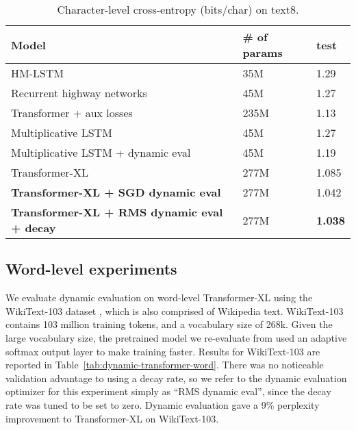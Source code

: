 \documentclass{article} \usepackage{iclr2018_conference,times}
\begin{document}
\begin{table*}[tb]
\begin{center}
\begin{adjustbox}{width=1\textwidth}
\begin{tabular}{l  l  l  } \toprule
Model & \# of params & test \\
\midrule
HM-LSTM \citep{chung2017} & 35M & 1.29 \\
Recurrent highway networks \citep{zilly2017} & 45M & 1.27   \\
Transformer + aux losses \citep{al2018} & 235M & 1.13 \\
Multiplicative LSTM \citep{krause2016} & 45M & 1.27  \\
Multiplicative LSTM + dynamic eval \citep{krause2018} & 45M & 1.19 \\
\midrule
Transformer-XL \citep{dai2019} & 277M  & 1.085 \\
\textbf{Transformer-XL + SGD dynamic eval} &  277M  & 1.042  \\
\textbf{Transformer-XL + RMS dynamic eval + decay} & 277M  & \textbf{1.038}   \\
\bottomrule
\end{tabular}
\end{adjustbox}
\end{center}
\caption{Character-level cross-entropy (bits/char) on text8.}
\label{tab:dynamic-transformer-text8}
\end{table*}

\subsection{Word-level experiments}

We evaluate dynamic evaluation on word-level Transformer-XL using the WikiText-103 dataset \citep{Merity2016}, which is also comprised of Wikipedia text. WikiText-103 contains 103 million training tokens, and a vocabulary size of 268k. Given the large vocabulary size, the pretrained model we re-evaluate from \citet{dai2019} used an adaptive softmax output layer \citep{grave2017a} to make training faster. Results for WikiText-103 are reported in Table~\ref{tab:dynamic-transformer-word}. There was no noticeable validation advantage to using a decay rate, so we refer to the dynamic evaluation optimizer for this experiment simply as ``RMS dynamic eval'', since the decay rate was tuned to be set to zero. Dynamic evaluation gave a 9\% perplexity improvement to Transformer-XL on WikiText-103.
\end{document}
